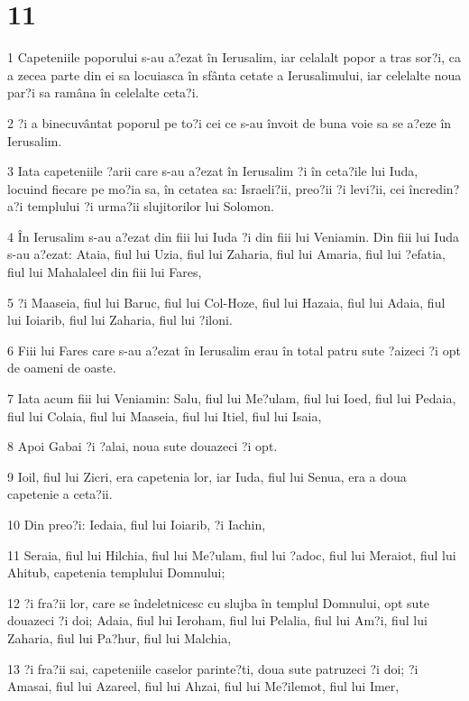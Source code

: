 \chapter{11}

\par 1 Capeteniile poporului s-au a?ezat în Ierusalim, iar celalalt popor a tras sor?i, ca a zecea parte din ei sa locuiasca în sfânta cetate a Ierusalimului, iar celelalte noua par?i sa ramâna în celelalte ceta?i.
\par 2 ?i a binecuvântat poporul pe to?i cei ce s-au învoit de buna voie sa se a?eze în Ierusalim.
\par 3 Iata capeteniile ?arii care s-au a?ezat în Ierusalim ?i în ceta?ile lui Iuda, locuind fiecare pe mo?ia sa, în cetatea sa: Israeli?ii, preo?ii ?i levi?ii, cei încredin?a?i templului ?i urma?ii slujitorilor lui Solomon.
\par 4 În Ierusalim s-au a?ezat din fiii lui Iuda ?i din fiii lui Veniamin. Din fiii lui Iuda s-au a?ezat: Ataia, fiul lui Uzia, fiul lui Zaharia, fiul lui Amaria, fiul lui ?efatia, fiul lui Mahalaleel din fiii lui Fares,
\par 5 ?i Maaseia, fiul lui Baruc, fiul lui Col-Hoze, fiul lui Hazaia, fiul lui Adaia, fiul lui Ioiarib, fiul lui Zaharia, fiul lui ?iloni.
\par 6 Fiii lui Fares care s-au a?ezat în Ierusalim erau în total patru sute ?aizeci ?i opt de oameni de oaste.
\par 7 Iata acum fiii lui Veniamin: Salu, fiul lui Me?ulam, fiul lui Ioed, fiul lui Pedaia, fiul lui Colaia, fiul lui Maaseia, fiul lui Itiel, fiul lui Isaia,
\par 8 Apoi Gabai ?i ?alai, noua sute douazeci ?i opt.
\par 9 Ioil, fiul lui Zicri, era capetenia lor, iar Iuda, fiul lui Senua, era a doua capetenie a ceta?ii.
\par 10 Din preo?i: Iedaia, fiul lui Ioiarib, ?i Iachin,
\par 11 Seraia, fiul lui Hilchia, fiul lui Me?ulam, fiul lui ?adoc, fiul lui Meraiot, fiul lui Ahitub, capetenia templului Domnului;
\par 12 ?i fra?ii lor, care se îndeletnicesc cu slujba în templul Domnului, opt sute douazeci ?i doi; Adaia, fiul lui Ieroham, fiul lui Pelalia, fiul lui Am?i, fiul lui Zaharia, fiul lui Pa?hur, fiul lui Malchia,
\par 13 ?i fra?ii sai, capeteniile caselor parinte?ti, doua sute patruzeci ?i doi; ?i Amasai, fiul lui Azareel, fiul lui Ahzai, fiul lui Me?ilemot, fiul lui Imer,
